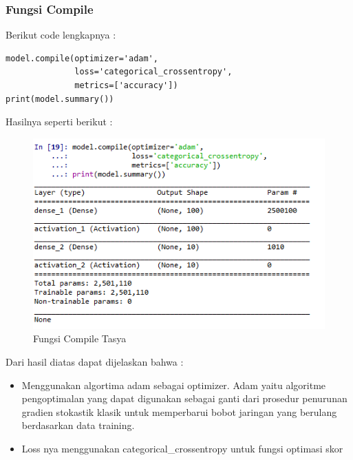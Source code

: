 \subsubsection{Fungsi Compile}
 Berikut code lengkapnya :
\begin{verbatim}
model.compile(optimizer='adam',
              loss='categorical_crossentropy',
              metrics=['accuracy'])
print(model.summary())
\end{verbatim}
Hasilnya seperti berikut : \\
\begin{figure}[ht]
\centering
\includegraphics[scale=0.5]{figures/chapter6tasya18.png}
\caption{Fungsi Compile Tasya}
\label{Praktek}
\end{figure}
Dari hasil diatas dapat dijelaskan bahwa :\\
\begin{itemize}
\item Menggunakan algortima adam sebagai optimizer. Adam yaitu algoritme pengoptimalan yang dapat digunakan sebagai ganti dari prosedur penurunan gradien stokastik klasik untuk memperbarui bobot jaringan yang berulang berdasarkan data training.
\item Loss nya menggunakan categorical\_crossentropy untuk fungsi optimasi skor
\end{itemize}

